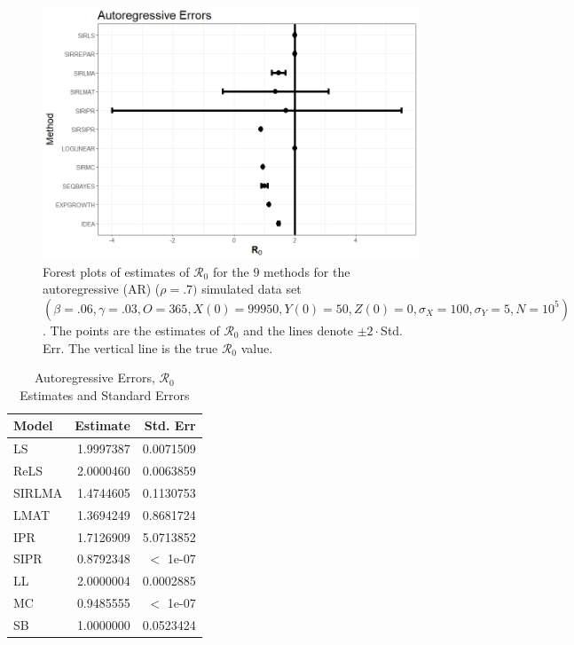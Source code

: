 \documentclass[12pt]{article}
\newcommand{\xxsir}{\ensuremath{9} } %
\newcommand{\rr}{\ensuremath{\mathcal{R}_0}}
\begin{document}
\begin{figure}[H]
  \centering
  \includegraphics[scale=0.5]{images/AR.jpeg}
  \caption{Forest plots of estimates of $\rr$ for the \xxsir methods for the autoregressive (AR) ($\rho=.7)$ simulated data set $(\beta=.06, \gamma=.03, O=365, X(0)=99950, Y(0)=50, Z(0)=0, \sigma_X=100, \sigma_Y=5, N=10^5)$.  The points are the estimates of $\rr$ and the lines denote $\pm 2\cdot $Std. Err.  The vertical line is the true $\rr$ value.}
  \end{figure}\label{fig:ar-res}
\begin{table}[H]
	
	\centering
	\begin{tabular}[t]{l|r|r}
		\hline
		Model & Estimate & Std. Err\\
		\hline
		LS & 1.9997387 & 0.0071509\\
		\hline
		ReLS & 2.0000460 & 0.0063859\\
		\hline
		SIRLMA & 1.4744605 & 0.1130753\\
		\hline
		LMAT & 1.3694249 & 0.8681724\\
		\hline
		IPR & 1.7126909 & 5.0713852\\
		\hline
		SIPR & 0.8792348 & $<$ 1e-07 \\
		\hline
		LL & 2.0000004 & 0.0002885\\
		\hline
		MC & 0.9485555 & $<$ 1e-07 \\
		\hline
		SB & 1.0000000 & 0.0523424\\
		\hline
	\end{tabular}
        \caption{Autoregressive Errors, $\rr$ Estimates and Standard Errors}\label{tab:ar-res}
\end{table}
\end{document}
